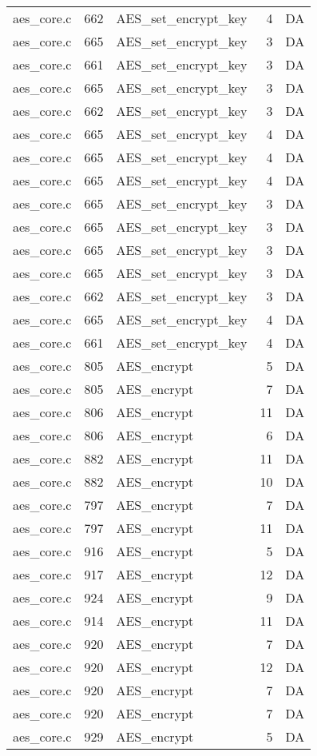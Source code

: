 \begin{table}
\begin{tabular}{lrlrr}
aes\_core.c& 662&AES\_set\_encrypt\_key&4 &DA\\
aes\_core.c& 665&AES\_set\_encrypt\_key&3 &DA\\
aes\_core.c& 661&AES\_set\_encrypt\_key&3 &DA\\
aes\_core.c& 665&AES\_set\_encrypt\_key&3 &DA\\
aes\_core.c& 662&AES\_set\_encrypt\_key&3 &DA\\
aes\_core.c& 665&AES\_set\_encrypt\_key&4 &DA\\
aes\_core.c& 665&AES\_set\_encrypt\_key&4 &DA\\
aes\_core.c& 665&AES\_set\_encrypt\_key&4 &DA\\
aes\_core.c& 665&AES\_set\_encrypt\_key&3 &DA\\
aes\_core.c& 665&AES\_set\_encrypt\_key&3 &DA\\
aes\_core.c& 665&AES\_set\_encrypt\_key&3 &DA\\
aes\_core.c& 665&AES\_set\_encrypt\_key&3 &DA\\
aes\_core.c& 662&AES\_set\_encrypt\_key&3 &DA\\
aes\_core.c& 665&AES\_set\_encrypt\_key&4 &DA\\
aes\_core.c& 661&AES\_set\_encrypt\_key&4 &DA\\
aes\_core.c& 805&AES\_encrypt&5 &DA\\
aes\_core.c& 805&AES\_encrypt&7 &DA\\
aes\_core.c& 806&AES\_encrypt&11&DA\\
aes\_core.c& 806&AES\_encrypt&6 &DA\\
aes\_core.c& 882&AES\_encrypt&11&DA\\
aes\_core.c& 882&AES\_encrypt&10&DA\\
aes\_core.c& 797&AES\_encrypt&7 &DA\\
aes\_core.c& 797&AES\_encrypt&11&DA\\
aes\_core.c& 916&AES\_encrypt&5 &DA\\
aes\_core.c& 917&AES\_encrypt&12&DA\\
aes\_core.c& 924&AES\_encrypt&9 &DA\\
aes\_core.c& 914&AES\_encrypt&11&DA\\
aes\_core.c& 920&AES\_encrypt&7 &DA\\
aes\_core.c& 920&AES\_encrypt&12&DA\\
aes\_core.c& 920&AES\_encrypt&7 &DA\\
aes\_core.c& 920&AES\_encrypt&7 &DA\\
aes\_core.c& 929&AES\_encrypt&5 &DA\\

\end{tabular}
\end{table}
